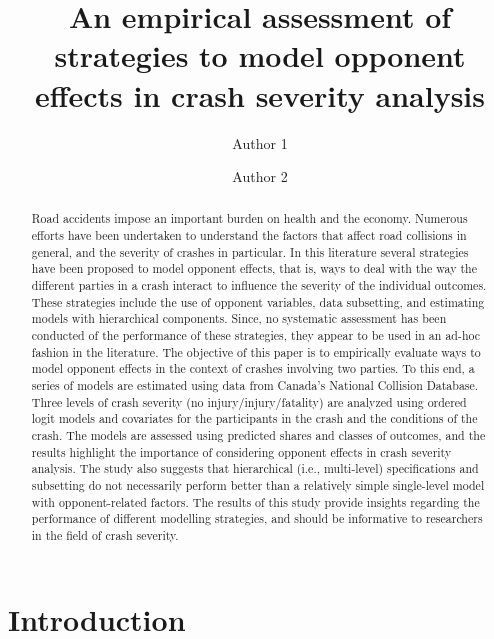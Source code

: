 \documentclass[]{elsarticle} %
\begin{document}
\begin{frontmatter}

  \title{An empirical assessment of strategies to model opponent effects in crash
severity analysis}
    \author[Some University]{Author 1}
    \author[Another University]{Author 2}
      \address[Some University]{Address}
    \address[Another University]{Address}
    
  \begin{abstract}
  Road accidents impose an important burden on health and the economy.
  Numerous efforts have been undertaken to understand the factors that
  affect road collisions in general, and the severity of crashes in
  particular. In this literature several strategies have been proposed to
  model opponent effects, that is, ways to deal with the way the different
  parties in a crash interact to influence the severity of the individual
  outcomes. These strategies include the use of opponent variables, data
  subsetting, and estimating models with hierarchical components. Since,
  no systematic assessment has been conducted of the performance of these
  strategies, they appear to be used in an ad-hoc fashion in the
  literature. The objective of this paper is to empirically evaluate ways
  to model opponent effects in the context of crashes involving two
  parties. To this end, a series of models are estimated using data from
  Canada's National Collision Database. Three levels of crash severity (no
  injury/injury/fatality) are analyzed using ordered logit models and
  covariates for the participants in the crash and the conditions of the
  crash. The models are assessed using predicted shares and classes of
  outcomes, and the results highlight the importance of considering
  opponent effects in crash severity analysis. The study also suggests
  that hierarchical (i.e., multi-level) specifications and subsetting do
  not necessarily perform better than a relatively simple single-level
  model with opponent-related factors. The results of this study provide
  insights regarding the performance of different modelling strategies,
  and should be informative to researchers in the field of crash severity.
  \end{abstract}
  
 \end{frontmatter}

\hypertarget{introduction}{%
\section{Introduction}\label{introduction}}
\end{document}
